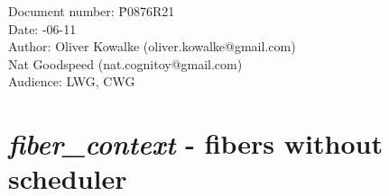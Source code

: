 \documentclass[fontsize=10pt,paper=A4,pagesize,DIV=15]{scrartcl}
\begin{document}
\small
\begin{tabbing}
    Document number: \= P0876R21\\
    Date:            -06-11\\
    Author:          \> Oliver Kowalke (oliver.kowalke@gmail.com)\\
                     \> Nat Goodspeed (nat.cognitoy@gmail.com)\\
    Audience:        \> LWG, CWG\\
\end{tabbing}

\section*{\emph{fiber\_context} - fibers without scheduler}


\tableofcontents




\newpage



























\end{document}
